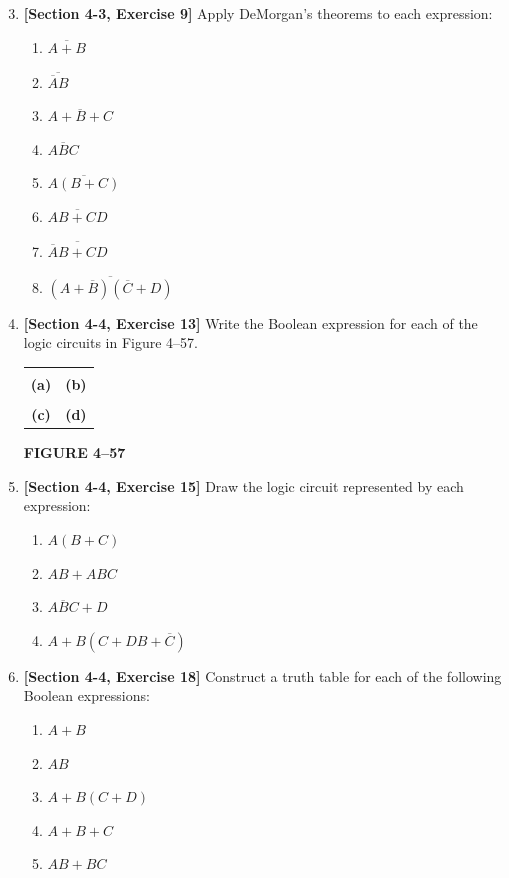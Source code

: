 \documentclass[11pt]{article}
\begin{document}
\begin{enumerate}
\setcounter{enumi}{2}

\item \textbf{[Section 4-3, Exercise 9]}
Apply DeMorgan's theorems to each expression:
\begin{enumerate}[label=(\alph*)]
    \item $\overline{A+B}$
    \item $\overline{\overline{A}B}$
    \item $\overline{A+B+C}$
    \item $\overline{ABC}$
    \item $\overline{A(B+C)}$
    \item $\overline{AB+CD}$
    \item $\overline{\overline{A}B+CD}$
    \item $\overline{(A+\overline{B})(\overline{C}+D)}$
\end{enumerate}

\item \textbf{[Section 4-4, Exercise 13]}
Write the Boolean expression for each of the logic circuits in Figure 4--57.

\begin{center}
\begin{tabular}{cc}
 &
 \\
\textbf{(a)} & \textbf{(b)} \\[0.18cm]
 &
 \\
\textbf{(c)} & \textbf{(d)}
\end{tabular}

\vspace{0.08cm}
\textbf{FIGURE 4--57}
\end{center}

\item \textbf{[Section 4-4, Exercise 15]}
Draw the logic circuit represented by each expression:
\begin{enumerate}[label=(\alph*)]
    \item $A(B+C)$
    \item $AB+ABC$
    \item $\overline{ABC}+D$
    \item $A+B(C+DB+\overline{C})$
\end{enumerate}

\item \textbf{[Section 4-4, Exercise 18]}
Construct a truth table for each of the following Boolean expressions:
\begin{enumerate}[label=(\alph*)]
    \item $A+B$
    \item $AB$
    \item $A+B(C+D)$
    \item $A+B+C$
    \item $AB+BC$
\end{enumerate}


\end{enumerate}
\end{document}
